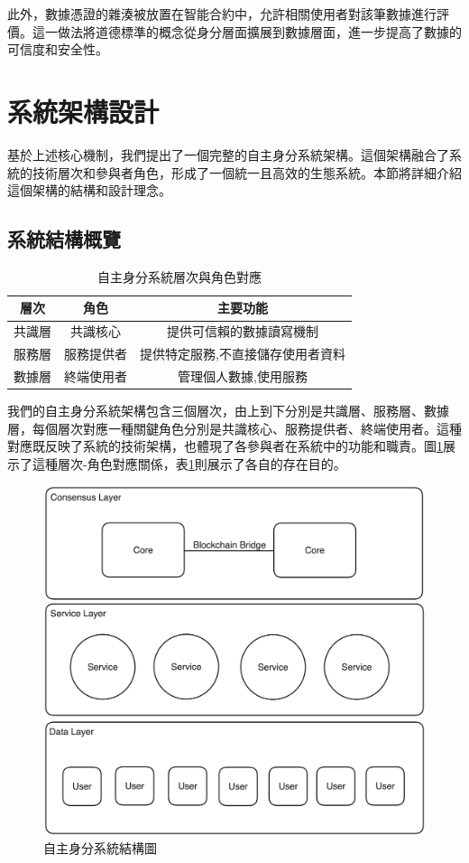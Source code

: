 此外，數據憑證的雜湊被放置在智能合約中，允許相關使用者對該筆數據進行評價。這一做法將道德標準的概念從身分層面擴展到數據層面，進一步提高了數據的可信度和安全性。
\section{系統架構設計}
基於上述核心機制，我們提出了一個完整的自主身分系統架構。這個架構融合了系統的技術層次和參與者角色，形成了一個統一且高效的生態系統。本節將詳細介紹這個架構的結構和設計理念。
\subsection{系統結構概覽}
\begin{table}[h]
  \centering
  \begin{tabular}{|c|c|c|}
    \hline
    層次  & 角色    & 主要功能              \\
    \hline
    共識層 & 共識核心  & 提供可信賴的數據讀寫機制      \\
    \hline
    服務層 & 服務提供者 & 提供特定服務,不直接儲存使用者資料 \\
    \hline
    數據層 & 終端使用者 & 管理個人數據,使用服務       \\
    \hline
  \end{tabular}
  \caption{自主身分系統層次與角色對應}
  \label{tab:system-layers}
\end{table}
我們的自主身分系統架構包含三個層次，由上到下分別是共識層、服務層、數據層，每個層次對應一種關鍵角色分別是共識核心、服務提供者、終端使用者。這種對應既反映了系統的技術架構，也體現了各參與者在系統中的功能和職責。圖\ref{fig:aid-system-layer}展示了這種層次-角色對應關係，表\ref{tab:system-layers}則展示了各自的存在目的。
\begin{figure}[h]
  \centering
  \includegraphics[width=\linewidth,keepaspectratio]{figures/aidLayers.png}
  \caption{自主身分系統結構圖}
  \label{fig:aid-system-layer}
\end{figure}
